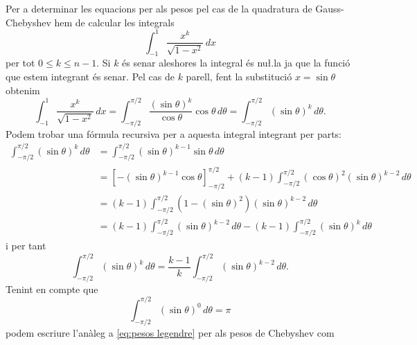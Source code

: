 \documentclass[12pt]{article}
\numberwithin{table}{section}
\numberwithin{figure}{section}
\numberwithin{equation}{section}
\begin{document}
Per a determinar les equacions per als pesos pel cas de la quadratura de Gauss-Chebyshev hem de calcular les integrals 
\begin{equation*}
	\int_{-1}^{1}\frac{x^k}{\sqrt{1 - x^2}} \,dx
\end{equation*}
per tot \( 0 \leq k \leq n-1 \). Si \( k \) és senar aleshores la integral és nu\l.la ja que la funció que estem integrant és senar. Pel cas de \( k \) parell, fent la substitució \( x = \sin{\theta} \) obtenim
\begin{equation*}
	\int_{-1}^{1}\frac{x^k}{\sqrt{1 - x^2}} \,dx = \int_{-\pi/2}^{\pi/2} \frac{(\sin{\theta})^k}{\cos{\theta}}\cos{\theta}\,d\theta = \int_{-\pi/2}^{\pi/2} (\sin{\theta})^k \,d\theta. 
\end{equation*}
Podem trobar una fórmula recursiva per a aquesta integral integrant per parts:
\begin{align*}
	\int_{-\pi/2}^{\pi/2} (\sin{\theta})^k \,d\theta &= \int_{-\pi/2}^{\pi/2}  (\sin{\theta})^{k-1} \sin{\theta} \,d\theta \\
																									 &= \left[-(\sin{\theta})^{k-1}\cos{\theta}\right]_{-\pi/2}^{\pi/2} + (k - 1) \int_{-\pi/2}^{\pi/2} (\cos{\theta})^2 (\sin{\theta})^{k-2} \, d\theta \\
																									 &= (k-1)\int_{-\pi/2}^{\pi/2} (1 - (\sin{\theta})^2 )(\sin{\theta})^{k-2} \, d\theta \\ 
																									 &= (k-1) \int_{-\pi/2}^{\pi/2} (\sin{\theta})^{k-2}\,d\theta -(k-1) \int_{-\pi/2}^{\pi/2} (\sin{\theta})^{k}\,d\theta
\end{align*}
i per tant 
\begin{equation*}
	\int_{-\pi/2}^{\pi/2} (\sin{\theta})^{k}\,d\theta = \frac{k -1}{k}\int_{-\pi/2}^{\pi/2} (\sin{\theta})^{k-2}\,d\theta .
\end{equation*}
Tenint en compte que 
\begin{equation*}
	\int_{-\pi/2}^{\pi/2} (\sin{\theta})^{0}\,d\theta = \pi
\end{equation*}
podem escriure l'anàleg a \cref{eq:pesos legendre} per als pesos de Chebyshev com
\end{document}
